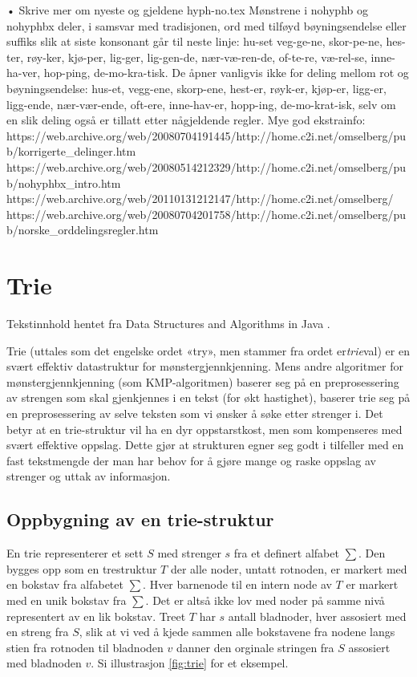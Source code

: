 	•	Skrive mer om nyeste og gjeldene hyph-no.tex
Mønstrene i nohyphb og nohyphbx deler, i samsvar med tradisjonen, ord med tilføyd bøyningsendelse eller suffiks slik at siste konsonant går til neste linje: hu-set veg-ge-ne, skor-pe-ne, hes-ter, røy-ker, kjø-per, lig-ger, lig-gen-de, nær-væ-ren-de, of-te-re, væ-rel-se, inne-ha-ver, hop-ping, de-mo-kra-tisk. De åpner vanligvis ikke for deling mellom rot og bøyningsendelse: hus-et, vegg-ene, skorp-ene, hest-er, røyk-er, kjøp-er, ligg-er, ligg-ende, nær-vær-ende, oft-ere, inne-hav-er, hopp-ing, de-mo-krat-isk, selv om en slik deling også er tillatt etter någjeldende regler.
Mye god ekstrainfo:
https://web.archive.org/web/20080704191445/http://home.c2i.net/omselberg/pub/korrigerte\_delinger.htm
https://web.archive.org/web/20080514212329/http://home.c2i.net/omselberg/pub/nohyphbx\_intro.htm
https://web.archive.org/web/20110131212147/http://home.c2i.net/omselberg/
https://web.archive.org/web/20080704201758/http://home.c2i.net/omselberg/pub/norske\_orddelingsregler.htm

\section{Trie}
\label{sec:trie}

Tekstinnhold hentet fra Data Structures and Algorithms in Java \cite{goodrich2014data}.

Trie (uttales som det engelske ordet «try», men stammer fra ordet er\textit{trie}val) er en svært effektiv datastruktur for mønstergjennkjenning. Mens andre algoritmer for mønstergjennkjenning (som KMP-algoritmen) baserer seg på en preprosessering av strengen som skal gjenkjennes i en tekst (for økt hastighet), baserer trie seg på en preprosessering av selve teksten som vi ønsker å søke etter strenger i. Det betyr at en trie-struktur vil ha en dyr oppstarstkost, men som kompenseres med svært effektive oppslag. Dette gjør at strukturen egner seg godt i tilfeller med en fast tekstmengde der man har behov for å gjøre mange og raske oppslag av strenger og uttak av informasjon.

\subsection{Oppbygning av en trie-struktur}

En trie representerer et sett $S$ med strenger $s$ fra et definert alfabet $\sum$. Den bygges opp som en trestruktur $T$ der alle noder, untatt rotnoden, er markert med en bokstav fra alfabetet $\sum$. Hver barnenode til en intern node av $T$ er markert med en unik bokstav fra $\sum$. Det er altså ikke lov med noder på samme nivå representert av en lik bokstav. Treet $T$ har $s$ antall bladnoder, hver assosiert med en streng fra $S$, slik at vi ved å kjede sammen alle bokstavene fra nodene langs stien fra rotnoden til bladnoden $v$ danner den orginale stringen fra $S$ assosiert med bladnoden $v$. Si illustrasjon \ref{fig:trie} for et eksempel. 

